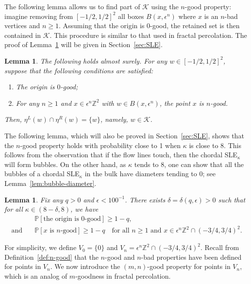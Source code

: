 \documentclass[a4paper]{article}
\numberwithin{equation}{section}
\newtheorem{lemma}[theorem]{Lemma}
\numberwithin{equation}{section}
\renewcommand{\1}{\mathbf{1}}
\begin{document}
The following lemma allows us to find part of $\mathcal{K}$ using the $n$-good property: imagine removing from $[-1/2,1/2]^2$ all boxes $B(x, \epsilon^n)$ where $x$ is an $n$-bad vertices and $n \geq 1$. Assuming that the origin is $0$-good, the retained set is then contained in $\mathcal{K}$. This procedure is similar to that used in fractal percolation. The proof of Lemma~\ref{lem:flow-line-not-touch} will be given in Section~\ref{sec:SLE}.

\begin{lemma}\label{lem:flow-line-not-touch}
    The following holds almost surely. For any $w \in [-1/2,1/2]^2$, suppose that the following conditions are satisfied:
    \begin{enumerate}[(1)]
        \item The origin is $0$-good;
        \item For any $n \geq 1$ and $x \in \epsilon^n \mathbb{Z}^2$ with $w \in B(x, \epsilon^n)$, the point $x$ is $n$-good.
    \end{enumerate}
    Then, $\eta^L(w) \cap \eta^R(w) = \{w \}$, namely, $w \in \mathcal{K}$.
\end{lemma}

The following lemma, which will also be proved in Section~\ref{sec:SLE}, shows that the $n$-good property holds with probability close to 1 when $\kappa$ is close to 8. This follows from the observation that if the flow lines touch, then the chordal SLE$_\kappa$ will form bubbles. On the other hand, as $\kappa$ tends to 8, one can show that all the bubbles of a chordal SLE$_\kappa$ in the bulk have diameters tending to 0; see Lemma~\ref{lem:bubble-diameter}.

\begin{lemma}\label{lem:kappa-to-8}
    Fix any $q>0$ and $\epsilon < 100^{-1}$. There exists $\delta = \delta(q, \epsilon) >0$ such that for all $\kappa \in (8 - \delta, 8)$, we have
    \begin{align*}
    &\mathbb{P}[\mbox{the origin is } 0 \mbox{-good}] \geq 1-q,\\
    \mbox{and} \quad &\mathbb{P}[x \mbox{ is } n \mbox{-good}] \geq 1 - q \quad \mbox{for all } n \geq 1 \mbox{ and } x \in \epsilon^n \mathbb{Z}^2 \cap (-3/4,3/4)^2.
    \end{align*}
\end{lemma}

For simplicity, we define $V_0 = \{0\}$ and $V_n = \epsilon^n \mathbb{Z}^2 \cap (-3/4,3/4)^2$. Recall from Definition~\ref{def:n-good} that the $n$-good and $n$-bad properties have been defined for points in $V_n$. We now introduce the $(m,n)$-good property for points in $V_n$, which is an analog of $m$-goodness in fractal percolation.
\end{document}
